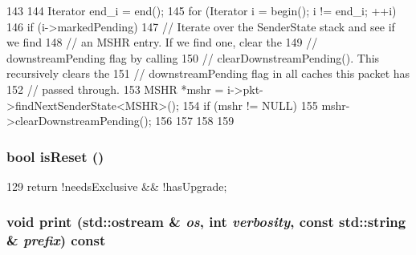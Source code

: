 \begin{DoxyCode}
143 {
144     Iterator end_i = end();
145     for (Iterator i = begin(); i != end_i; ++i) {
146         if (i->markedPending) {
147             // Iterate over the SenderState stack and see if we find
148             // an MSHR entry. If we find one, clear the
149             // downstreamPending flag by calling
150             // clearDownstreamPending(). This recursively clears the
151             // downstreamPending flag in all caches this packet has
152             // passed through.
153             MSHR *mshr = i->pkt->findNextSenderState<MSHR>();
154             if (mshr != NULL) {
155                 mshr->clearDownstreamPending();
156             }
157         }
158     }
159 }
\end{DoxyCode}
\hypertarget{classMSHR_1_1TargetList_a69511868e2e419afd1e46803a3debe28}{
\subsubsection[{isReset}]{\setlength{\rightskip}{0pt plus 5cm}bool isReset ()}}
\label{classMSHR_1_1TargetList_a69511868e2e419afd1e46803a3debe28}



\begin{DoxyCode}
129 { return !needsExclusive && !hasUpgrade; }
\end{DoxyCode}
\hypertarget{classMSHR_1_1TargetList_a5cabeee2cd7415822c9088b27b3b9436}{
\subsubsection[{print}]{\setlength{\rightskip}{0pt plus 5cm}void print (std::ostream \& {\em os}, \/  int {\em verbosity}, \/  const std::string \& {\em prefix}) const}}
\label{classMSHR_1_1TargetList_a5cabeee2cd7415822c9088b27b3b9436}



